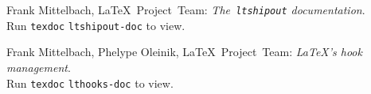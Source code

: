 \documentclass{ltnews}
\providecommand\Dash {\unskip \textemdash}
\begin{document}
\begin{thebibliography}{9}


 Frank Mittelbach, \LaTeX{}~Project~Team:
  \emph{The~\texttt{\upshape ltshipout} documentation}.\\
  Run \texttt{texdoc} \texttt{ltshipout-doc} to view.

 Frank Mittelbach, Phelype Oleinik, \LaTeX{}~Project~Team:
 \emph{\LaTeX's hook management}.\\
 Run \texttt{texdoc} \texttt{lthooks-doc} to view.



%
%
%
%
%
\end{thebibliography}
\end{document}
